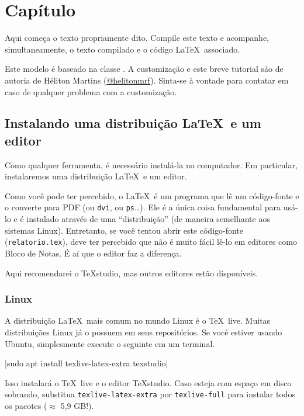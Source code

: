 \documentclass[12pt,oneside,a4paper,english,brazil]{abntex2}
\begin{document}
 \imprimircapa
 \textual
 \chapter{Capítulo}
      Aqui começa o texto propriamente dito. Compile este texto e acompanhe, simultaneamente, o texto compilado e o código \LaTeX\ associado.
      
      Este modelo é baseado na classe \abnTeX. A customização e este breve tutorial são de autoria de Héliton Martins (\href{https://t.me/helitonmrf}{@helitonmrf}). Sinta-se à vontade para contatar em caso de qualquer problema com a customização.
      
      \section{Instalando uma distribuição \LaTeX\ e um editor}
      
        Como qualquer ferramenta, é necessário instalá-la no computador. Em particular, instalaremos uma distribuição \LaTeX\ e um editor.
        
        Como você pode ter percebido, o \LaTeX\ é um programa que lê um código-fonte e o converte para PDF (ou \texttt{dvi}, ou \texttt{ps}\ldots). Ele é a única coisa fundamental para usá-lo e é instalado através de uma ``distribuição'' (de maneira semelhante aos sistemas Linux). Entretanto, se você tentou abrir este código-fonte (\texttt{relatorio.tex}), deve ter percebido que não é muito fácil lê-lo em editores como Bloco de Notas. É aí que o editor faz a diferença.
        
        Aqui recomendarei o \TeX studio, mas outros editores estão disponíveis.
        
            \subsection{Linux}
            
                A distribuição \LaTeX\ mais comum no mundo Linux é o \TeX\ live. Muitas distribuições Linux já o possuem em seus repositórios. Se você estiver usando Ubuntu, simplesmente execute o seguinte em um terminal.
                
                \begin{center}\ltx|sudo apt install texlive-latex-extra texstudio|\end{center}
                
                Isso instalará o \TeX\ live e o editor \TeX studio. Caso esteja com espaço em disco sobrando, substitua \texttt{texlive-latex-extra} por \texttt{texlive-full} para instalar todos os pacotes ($ \approx $ 5,9 GB!).
                
\end{document}
